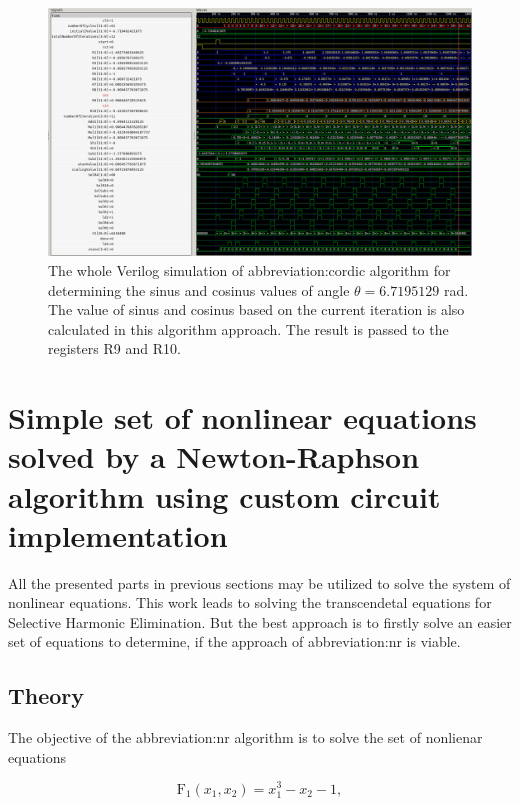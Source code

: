 \documentclass[a4paper, twoside, 11pt]{article}
\begin{document}
        \begin{figure}[htbp!]
            \centering
            \includegraphics[width=1\textwidth]{src/png/cordic-verilog-whole-sim_minus_6_7195129.png}
            \caption{The whole Verilog simulation of \gls{abbreviation:cordic} algorithm for determining the sinus and cosinus values of angle $\theta = 6.7195129$ rad. The value of sinus and cosinus based on the current iteration is also calculated in this algorithm approach. The result is passed to the registers R9 and R10.}
            \label{fig:cordic-verilog-whole-sim_minus_6_7195129}
        \end{figure}

\section{Simple set of nonlinear equations solved by a Newton-Raphson algorithm using custom circuit implementation}
    All the presented parts in previous sections may be utilized to solve the system of nonlinear equations. This work leads to solving the transcendetal equations for Selective Harmonic Elimination. But the best approach is to firstly solve an easier set of equations to determine, if the approach of \gls{abbreviation:nr} is viable.
    \subsection{Theory}
        The objective of the \gls{abbreviation:nr} algorithm is to solve the set of nonlienar equations


        \begin{equation}
            \text{F}_1 (x_1, x_2) = x_1^3 - x_2 - 1, 
        \end{equation}
\end{document}
